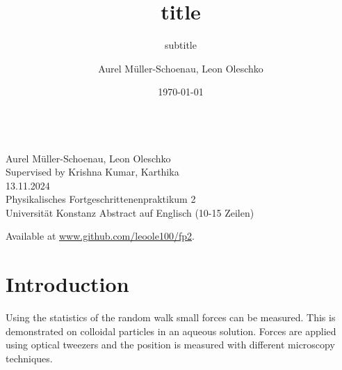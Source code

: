 \documentclass[
    twoside=false,
    twocolumn=true,
    fontsize=11pt,
]{scrarticle}
\begin{document}
\title{title}
\subtitle{subtitle}
\author{Aurel Müller-Schoenau, Leon Oleschko}
\date{\dotdate\today}


\begin{titlepage}
    \sffamily
    \vspace*{3cm}
    {
        \fontsize{32}{32}
    }
    \vspace{.25cm}\\
    {
        \Large
        Aurel Müller-Schoenau, Leon Oleschko\\
        Supervised by Krishna Kumar, Karthika
        \vspace{.05cm}\\
        13.11.2024
        \vspace{.25cm}\\
        \normalsize
        Physikalisches Fortgeschrittenenpraktikum 2\\
        Universität Konstanz
    }
    \vfill
    {
        \normalfont\normalsize
        Abstract auf Englisch (10-15 Zeilen)
        \blindtext[2]
    }
    \vfill
    \begin{flushright}
        Available at \url{www.github.com/leoole100/fp2}.
    \end{flushright}
\end{titlepage}

\section{Introduction}
Using the statistics of the random walk small forces can be measured.
This is demonstrated on colloidal particles in an aqueous solution.
Forces are applied using optical tweezers and the position is measured with different microscopy techniques.


\end{document}
